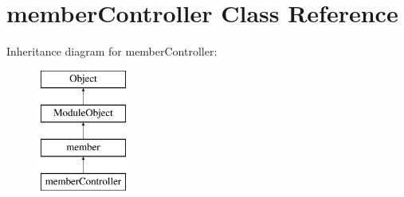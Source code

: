 \hypertarget{classmemberController}{}\section{member\+Controller Class Reference}
\label{classmemberController}
Inheritance diagram for member\+Controller\+:\begin{figure}[H]
\begin{center}
\leavevmode
\includegraphics[height=4.000000cm]{classmemberController}
\end{center}
\end{figure}
